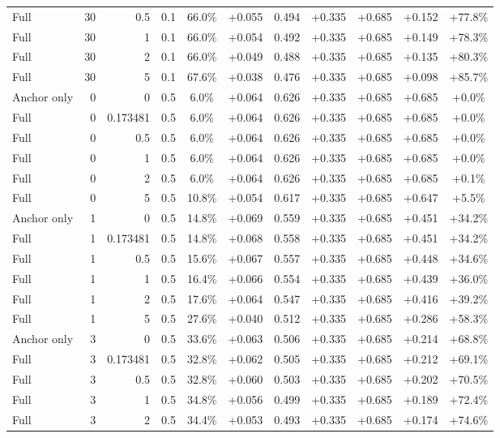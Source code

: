 \begin{table}[htbp]
\begin{tabular}{lrrrccccccc}
Full & 30 & 0.5 & 0.1 & 66.0\% & +0.055 & 0.494 & +0.335 & +0.685 & +0.152 & +77.8\% \\
Full & 30 & 1 & 0.1 & 66.0\% & +0.054 & 0.492 & +0.335 & +0.685 & +0.149 & +78.3\% \\
Full & 30 & 2 & 0.1 & 66.0\% & +0.049 & 0.488 & +0.335 & +0.685 & +0.135 & +80.3\% \\
Full & 30 & 5 & 0.1 & 67.6\% & +0.038 & 0.476 & +0.335 & +0.685 & +0.098 & +85.7\% \\
Anchor only & 0 & 0 & 0.5 & 6.0\% & +0.064 & 0.626 & +0.335 & +0.685 & +0.685 & +0.0\% \\
Full & 0 & 0.173481 & 0.5 & 6.0\% & +0.064 & 0.626 & +0.335 & +0.685 & +0.685 & +0.0\% \\
Full & 0 & 0.5 & 0.5 & 6.0\% & +0.064 & 0.626 & +0.335 & +0.685 & +0.685 & +0.0\% \\
Full & 0 & 1 & 0.5 & 6.0\% & +0.064 & 0.626 & +0.335 & +0.685 & +0.685 & +0.0\% \\
Full & 0 & 2 & 0.5 & 6.0\% & +0.064 & 0.626 & +0.335 & +0.685 & +0.685 & +0.1\% \\
Full & 0 & 5 & 0.5 & 10.8\% & +0.054 & 0.617 & +0.335 & +0.685 & +0.647 & +5.5\% \\
Anchor only & 1 & 0 & 0.5 & 14.8\% & +0.069 & 0.559 & +0.335 & +0.685 & +0.451 & +34.2\% \\
Full & 1 & 0.173481 & 0.5 & 14.8\% & +0.068 & 0.558 & +0.335 & +0.685 & +0.451 & +34.2\% \\
Full & 1 & 0.5 & 0.5 & 15.6\% & +0.067 & 0.557 & +0.335 & +0.685 & +0.448 & +34.6\% \\
Full & 1 & 1 & 0.5 & 16.4\% & +0.066 & 0.554 & +0.335 & +0.685 & +0.439 & +36.0\% \\
Full & 1 & 2 & 0.5 & 17.6\% & +0.064 & 0.547 & +0.335 & +0.685 & +0.416 & +39.2\% \\
Full & 1 & 5 & 0.5 & 27.6\% & +0.040 & 0.512 & +0.335 & +0.685 & +0.286 & +58.3\% \\
Anchor only & 3 & 0 & 0.5 & 33.6\% & +0.063 & 0.506 & +0.335 & +0.685 & +0.214 & +68.8\% \\
Full & 3 & 0.173481 & 0.5 & 32.8\% & +0.062 & 0.505 & +0.335 & +0.685 & +0.212 & +69.1\% \\
Full & 3 & 0.5 & 0.5 & 32.8\% & +0.060 & 0.503 & +0.335 & +0.685 & +0.202 & +70.5\% \\
Full & 3 & 1 & 0.5 & 34.8\% & +0.056 & 0.499 & +0.335 & +0.685 & +0.189 & +72.4\% \\
Full & 3 & 2 & 0.5 & 34.4\% & +0.053 & 0.493 & +0.335 & +0.685 & +0.174 & +74.6\% \\

\end{tabular}
\end{table}
